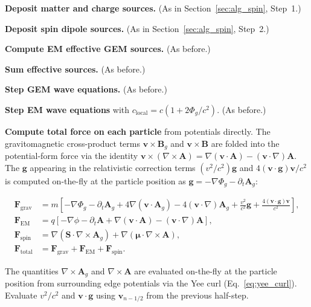 \documentclass[11pt,a4paper]{article}
\newcommand{\vv}[1]{\mathbf{#1}}
\newcommand{\Phig}{\Phi_g}
\newcommand{\Ag}{\vv{A}_g}
\begin{document}
\begin{algsteps}
  \item \textbf{Deposit matter and charge sources.} (As in Section~\ref{sec:alg_spin}, Step~1.)

  \item \textbf{Deposit spin dipole sources.} (As in Section~\ref{sec:alg_spin}, Step~2.)

  \item \textbf{Compute EM effective GEM sources.} (As before.)

  \item \textbf{Sum effective sources.} (As before.)

  \item \textbf{Step GEM wave equations.} (As before.)

  \item \textbf{Step EM wave equations} with $c_{\mathrm{local}} = c(1+2\Phig/c^2)$. (As before.)

  \item \textbf{Compute total force on each particle} from potentials directly.  The gravitomagnetic cross-product terms $\vv{v}\times\vv{B}_g$ and $\vv{v}\times\vv{B}$ are folded into the potential-form force via the identity $\vv{v}\times(\nabla\times\vv{A}) = \nabla(\vv{v}\cdot\vv{A}) - (\vv{v}\cdot\nabla)\vv{A}$.  The $\vv{g}$ appearing in the relativistic correction terms $(v^2/c^2)\vv{g}$ and $4(\vv{v}\cdot\vv{g})\vv{v}/c^2$ is computed on-the-fly at the particle position as $\vv{g} = -\nabla\Phig - \partial_t\Ag$:
  \begin{eqbox}
  \begin{align*}
    \vv{F}_{\mathrm{grav}}  &= m\!\left[-\nabla\Phig - \partial_t\Ag
                                + 4\nabla(\vv{v}\cdot\Ag) - 4(\vv{v}\cdot\nabla)\Ag
                                + \frac{v^2}{c^2}\vv{g}
                                + \frac{4(\vv{v}\cdot\vv{g})\vv{v}}{c^2}\right], \\[4pt]
    \vv{F}_{\mathrm{EM}}    &= q\!\left[-\nabla\phi - \partial_t\vv{A}
                                + \nabla(\vv{v}\cdot\vv{A}) - (\vv{v}\cdot\nabla)\vv{A}\right], \\[4pt]
    \vv{F}_{\mathrm{spin}}  &= \nabla(\vv{S}\cdot\nabla\times\Ag)
                              + \nabla(\boldsymbol{\mu}\cdot\nabla\times\vv{A}), \\[4pt]
    \vv{F}_{\mathrm{total}} &= \vv{F}_{\mathrm{grav}} + \vv{F}_{\mathrm{EM}} + \vv{F}_{\mathrm{spin}}.
  \end{align*}
  \end{eqbox}
  The quantities $\nabla\times\Ag$ and $\nabla\times\vv{A}$ are evaluated on-the-fly at the particle position from surrounding edge potentials via the Yee curl (Eq.~\ref{eq:yee_curl}).  Evaluate $v^2/c^2$ and $\vv{v}\cdot\vv{g}$ using $\vv{v}_{n-1/2}$ from the previous half-step.


\end{algsteps}
\end{document}
